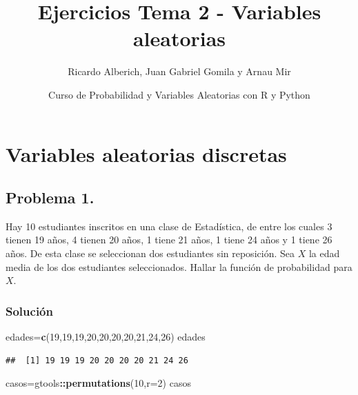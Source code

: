 \documentclass[]{article}
\title{Ejercicios Tema 2 - Variables aleatorias}
\author{Ricardo Alberich, Juan Gabriel Gomila y Arnau Mir}
\date{Curso de Probabilidad y Variables Aleatorias con R y Python}
\newenvironment{Shaded}{\begin{snugshade}}{\end{snugshade}}
\newcommand{\DataTypeTok}[1]{\textcolor[rgb]{0.13,0.29,0.53}{#1}}
\newcommand{\DecValTok}[1]{\textcolor[rgb]{0.00,0.00,0.81}{#1}}
\newcommand{\KeywordTok}[1]{\textcolor[rgb]{0.13,0.29,0.53}{\textbf{#1}}}
\newcommand{\NormalTok}[1]{#1}
\newcommand{\OperatorTok}[1]{\textcolor[rgb]{0.81,0.36,0.00}{\textbf{#1}}}
\begin{document}
\maketitle

{
\hypersetup{linkcolor=blue}
\setcounter{tocdepth}{4}
\tableofcontents
}
\hypertarget{variables-aleatorias-discretas}{%
\section{Variables aleatorias
discretas}\label{variables-aleatorias-discretas}}

\hypertarget{problema-1.}{%
\subsection{Problema 1.}\label{problema-1.}}

Hay 10 estudiantes inscritos en una clase de Estadística, de entre los
cuales 3 tienen 19 años, 4 tienen 20 años, 1 tiene 21 años, 1 tiene 24
años y 1 tiene 26 años. De esta clase se seleccionan dos estudiantes sin
reposición. Sea \(X\) la edad media de los dos estudiantes
seleccionados. Hallar la función de probabilidad para \(X\).

\hypertarget{soluciuxf3n}{%
\subsubsection{Solución}\label{soluciuxf3n}}

\begin{Shaded}
\begin{Highlighting}[]
\NormalTok{edades=}\KeywordTok{c}\NormalTok{(}\DecValTok{19}\NormalTok{,}\DecValTok{19}\NormalTok{,}\DecValTok{19}\NormalTok{,}\DecValTok{20}\NormalTok{,}\DecValTok{20}\NormalTok{,}\DecValTok{20}\NormalTok{,}\DecValTok{20}\NormalTok{,}\DecValTok{21}\NormalTok{,}\DecValTok{24}\NormalTok{,}\DecValTok{26}\NormalTok{)}
\NormalTok{edades}
\end{Highlighting}
\end{Shaded}

\begin{verbatim}
##  [1] 19 19 19 20 20 20 20 21 24 26
\end{verbatim}

\begin{Shaded}
\begin{Highlighting}[]
\NormalTok{casos=gtools}\OperatorTok{::}\KeywordTok{permutations}\NormalTok{(}\DecValTok{10}\NormalTok{,}\DataTypeTok{r=}\DecValTok{2}\NormalTok{)}
\NormalTok{casos}
\end{Highlighting}
\end{Shaded}
\end{document}
